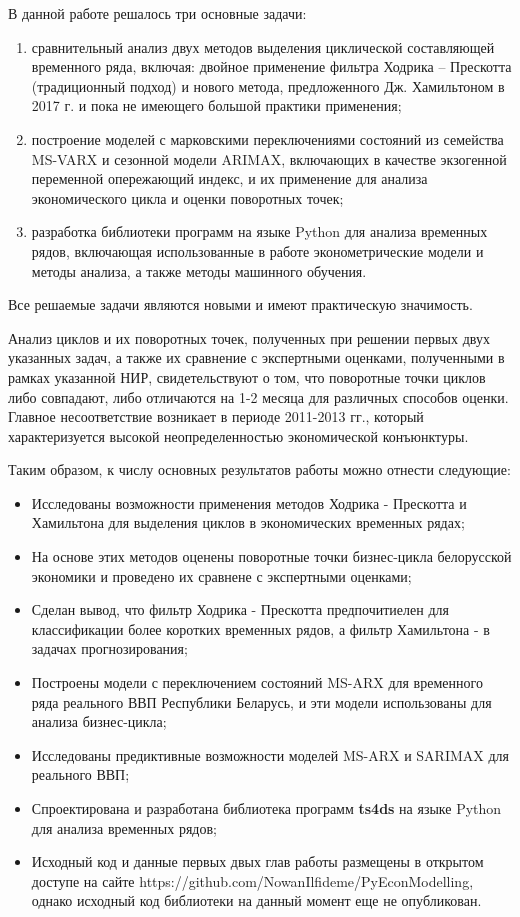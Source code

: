 \documentclass[a4paper,14pt]{extreport}
\begin{document}
{		В данной работе решалось три основные задачи:
		\begin{enumerate}
			\item сравнительный анализ двух методов выделения циклической составляющей временного ряда, включая: двойное применение фильтра Ходрика -- Прескотта (традиционный подход) и нового метода, предложенного Дж. Хамильтоном в 2017 г.  и пока не имеющего большой практики применения;
			\item построение моделей с марковскими переключениями состояний из семейства MS-VARX и сезонной модели ARIMAX, включающих в качестве экзогенной переменной опережающий индекс, и их применение для анализа экономического цикла и оценки поворотных точек;
			\item разработка библиотеки программ на языке Python для анализа временных рядов, включающая использованные в работе эконометрические модели и методы анализа, а также методы машинного обучения.
		\end{enumerate}
		
		Все решаемые задачи являются новыми и имеют практическую значимость. 
		
		Анализ циклов и их поворотных точек, полученных при решении первых двух указанных задач, а также их сравнение с экспертными оценками, полученными в рамках указанной НИР, свидетельствуют о том, что поворотные точки циклов либо совпадают, либо отличаются на 1-2 месяца для различных способов оценки. Главное несоответствие  возникает в периоде 2011-2013 гг., который характеризуется высокой неопределенностью экономической конъюнктуры.
		
		Таким образом, к числу основных результатов работы можно отнести следующие:
		
		\begin{itemize}
			\item Исследованы возможности применения методов Ходрика - Прескотта и Хамильтона для выделения циклов в экономических временных рядах;
			\item На основе этих методов оценены поворотные точки бизнес-цикла белорусской экономики и проведено их сравнене с экспертными оценками;
			\item Сделан вывод, что фильтр Ходрика - Прескотта предпочитиелен для классификации более коротких временных рядов, а фильтр Хамильтона - в задачах прогнозирования;
			\item Построены модели с переключением состояний MS-ARX для временного ряда реального ВВП Республики Беларусь, и эти модели использованы для анализа бизнес-цикла;
			\item Исследованы предиктивные возможности моделей MS-ARX и SARIMAX для реального ВВП;
			\item Спроектирована и разработана библиотека программ \textbf{ts4ds} на языке Python для анализа временных рядов;
			\item Исходный код и данные  первых двых глав работы размещены в открытом доступе на сайте {https://github.com/NowanIlfideme/PyEconModelling}, однако исходный код библиотеки на данный момент еще не опубликован.
		\end{itemize}
	}
	
\end{document}
